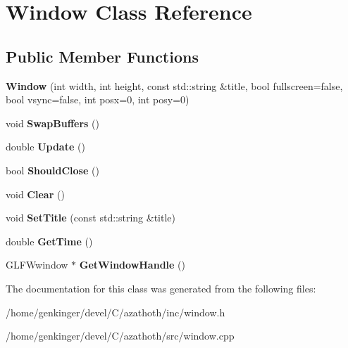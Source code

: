 \hypertarget{classWindow}{}\section{Window Class Reference}
\label{classWindow}
\subsection*{Public Member Functions}
\begin{DoxyCompactItemize}
\item 
\mbox{\label{classWindow_aed2cf14516a35d83ee43290e1b99b562}} 
{\bfseries Window} (int width, int height, const std\+::string \&title, bool fullscreen=false, bool vsync=false, int posx=0, int posy=0)
\item 
\mbox{\label{classWindow_abe1b83eda6980f2b9964aab08b5310ed}} 
void {\bfseries Swap\+Buffers} ()
\item 
\mbox{\label{classWindow_af6048cdfeabc5c2e2216e2e66ffaf4e9}} 
double {\bfseries Update} ()
\item 
\mbox{\label{classWindow_ad89997cacf4d57f2a28f291531e94b4f}} 
bool {\bfseries Should\+Close} ()
\item 
\mbox{\label{classWindow_a9904449165571eff36b106148ec1279f}} 
void {\bfseries Clear} ()
\item 
\mbox{\label{classWindow_a786ce3560240c525c443e984a50d9695}} 
void {\bfseries Set\+Title} (const std\+::string \&title)
\item 
\mbox{\label{classWindow_a5064bfa6c163ad8227c17c095f196d1f}} 
double {\bfseries Get\+Time} ()
\item 
\mbox{\label{classWindow_a1eb0ae686ca3a64ca67f10c11131581a}} 
G\+L\+F\+Wwindow $\ast$ {\bfseries Get\+Window\+Handle} ()
\end{DoxyCompactItemize}


The documentation for this class was generated from the following files\+:\begin{DoxyCompactItemize}
\item 
/home/genkinger/devel/\+C/azathoth/inc/window.\+h\item 
/home/genkinger/devel/\+C/azathoth/src/window.\+cpp\end{DoxyCompactItemize}
